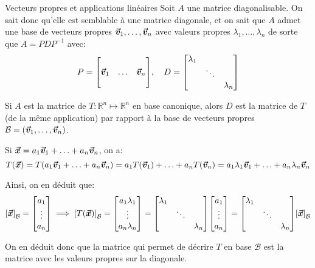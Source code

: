 \documentclass[a4paper]{article}
\begin{document}
\begin{parag}{Vecteurs propres et applications linéaires}
    Soit $A$ une matrice diagonalisable. On sait donc qu'elle est semblable à une matrice diagonale, et on sait que $A$ admet une base de vecteurs propres $\bm{\protect\vec{v}}_1, \ldots, \bm{\protect\vec{v}}_n$ avec valeurs propres $\lambda_1, \ldots, \lambda_n$ de sorte que $A = PDP^{-1}$ avec:
    \[P = \begin{bmatrix}  &  &  \\ \bvec{v}_1 & \ldots & \bvec{v}_n \\  &  &  \end{bmatrix}, \mathspace D = \begin{bmatrix} \lambda_1 &  &  \\  & \ddots &  \\  &  & \lambda_n \end{bmatrix} \]

    Si $A$ est la matrice de $T : \mathbb{R}^n \mapsto \mathbb{R}^n$ en base canonique, alors $D$ est la matrice de $T$ (de la même application) par rapport à la base de vecteurs propres $\mathcal{B} = \left(\bvec{v}_1, \ldots, \bvec{v}_n\right)$.

    Si $\bm{\protect\vec{x}} = a_1 \bm{\protect\vec{v}}_1 + \ldots + a_n \bm{\protect\vec{v}}_n$, on a:
    \[T\left(\bvec{x}\right) = T\left(a_1 \bvec{v}_1 + \ldots + a_n \bvec{v}_n\right) = a_1 T\left(\bvec{v}_1\right) + \ldots + a_n T\left(\bvec{v}_n\right) = a_1 \lambda_1 \bvec{v}_1 + \ldots + a_n \lambda_n \bvec{v}_n\]

    Ainsi, on en déduit que:
    \[\left[\bvec{x}\right]_{\mathcal{B}} = \begin{bmatrix} a_1 \\ \vdots \\ a_n \end{bmatrix} \implies \left[T\left(\bvec{x}\right)\right]_{\mathcal{B}} = \begin{bmatrix} a_1 \lambda_1 \\ \vdots \\ a_n \lambda_n \end{bmatrix} = \begin{bmatrix} \lambda_1 &  &  \\  & \ddots &  \\  &  & \lambda_n \end{bmatrix} \begin{bmatrix} a_1 \\ \vdots \\ a_n \end{bmatrix} = \begin{bmatrix} \lambda_1 &  &  \\  & \ddots &  \\  &  & \lambda_n \end{bmatrix} \left[\bvec{x}\right]_{\mathcal{B}}\]

    On en déduit donc que la matrice qui permet de décrire $T$ en base $\mathcal{B}$ est la matrice avec les valeurs propres sur la diagonale.
\end{parag}
\end{document}

